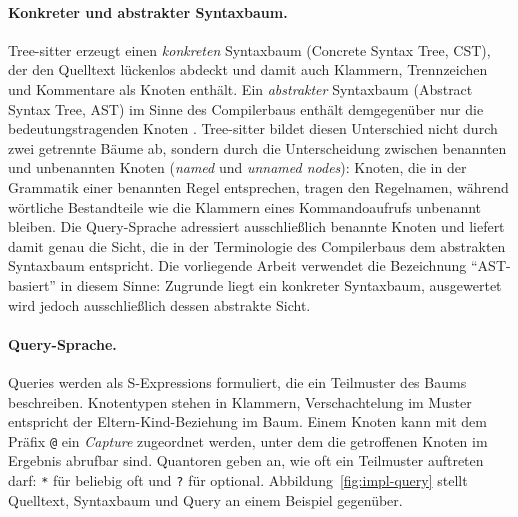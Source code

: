 \documentclass[12pt,a4paper,twoside,headsepline,parskip=half]{scrreprt}
\begin{document}
\paragraph{Konkreter und abstrakter Syntaxbaum.}
Tree-sitter erzeugt einen \emph{konkreten} Syntaxbaum (Concrete Syntax Tree, CST),
der den Quelltext lückenlos abdeckt und damit auch Klammern, Trennzeichen und
Kommentare als Knoten enthält. Ein \emph{abstrakter} Syntaxbaum (Abstract Syntax
Tree, AST) im Sinne des Compilerbaus enthält demgegenüber nur die bedeutungstragenden
Knoten \cite{Aho_Lam_Sethi_Ullman_2007}. Tree-sitter bildet diesen Unterschied nicht
durch zwei getrennte Bäume ab, sondern durch die Unterscheidung zwischen benannten und
unbenannten Knoten (\emph{named} und \emph{unnamed nodes}): Knoten, die in der
Grammatik einer benannten Regel entsprechen, tragen den Regelnamen, während wörtliche
Bestandteile wie
die Klammern eines Kommandoaufrufs unbenannt bleiben. Die Query-Sprache adressiert
ausschließlich benannte Knoten und liefert damit genau die Sicht, die in der
Terminologie des Compilerbaus dem abstrakten Syntaxbaum entspricht. Die vorliegende
Arbeit verwendet die Bezeichnung \enquote{AST-basiert} in diesem Sinne: Zugrunde liegt
ein konkreter Syntaxbaum, ausgewertet wird jedoch ausschließlich dessen abstrakte
Sicht.

\paragraph{Query-Sprache.}
Queries werden als S-Expressions formuliert, die ein Teilmuster des Baums beschreiben.
Knotentypen stehen in Klammern, Verschachtelung im Muster entspricht der
Eltern-Kind-Beziehung im Baum. Einem Knoten kann mit dem Präfix \texttt{@} ein
\emph{Capture} zugeordnet werden, unter dem die getroffenen Knoten im Ergebnis
abrufbar sind. Quantoren geben an, wie oft ein Teilmuster auftreten darf:
\texttt{*} für beliebig oft und \texttt{?} für optional.
Abbildung~\ref{fig:impl-query} stellt Quelltext, Syntaxbaum und Query an einem
Beispiel gegenüber.
\end{document}
